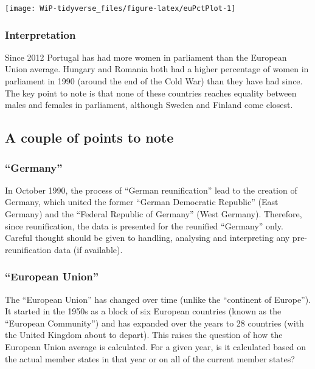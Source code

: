 \documentclass[a4paper,9pt,twocolumn,twoside,printwatermark=false]{pinp}
\begin{document}
\begin{center}\texttt{[image: WiP-tidyverse\_files/figure-latex/euPctPlot-1]} \end{center}

\subsubsection{Interpretation}\label{interpretation-1}

Since 2012 Portugal has had more women in parliament than the European
Union average. Hungary and Romania both had a higher percentage of women
in parliament in 1990 (around the end of the Cold War) than they have
had since. The key point to note is that none of these countries reaches
equality between males and females in parliament, although Sweden and
Finland come closest.

\subsection{A couple of points to
note}\label{a-couple-of-points-to-note}

\subsubsection{\texorpdfstring{``Germany''}{Germany}}\label{germany}

In October 1990, the process of ``German reunification'' lead to the
creation of Germany, which united the former ``German Democratic
Republic'' (East Germany) and the ``Federal Republic of Germany'' (West
Germany). Therefore, since reunification, the data is presented for the
reunified ``Germany'' only. Careful thought should be given to handling,
analysing and interpreting any pre-reunification data (if available).

\subsubsection{\texorpdfstring{``European
Union''}{European Union}}\label{european-union}

The ``European Union'' has changed over time (unlike the ``continent of
Europe''). It started in the 1950s as a block of six European countries
(known as the ``European Community'') and has expanded over the years to
28 countries (with the United Kingdom about to depart). This raises the
question of how the European Union average is calculated. For a given
year, is it calculated based on the actual member states in that year or
on all of the current member states?
\end{document}
